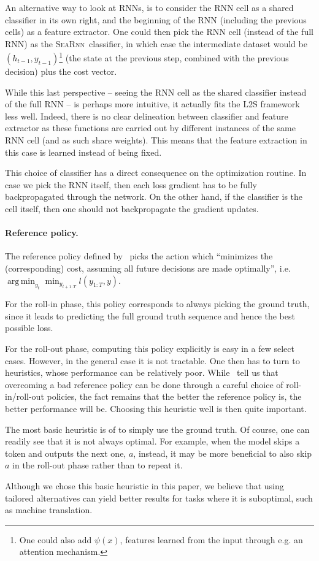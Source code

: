 \documentclass{article}
\newcommand{\SEARNN}{\textsc{SeaRnn}}
\DeclareMathOperator*{\argmin}{arg\,min}
\begin{document}
	An alternative way to look at RNNs, is to consider the RNN cell as a shared classifier in its own right, and the beginning of the RNN (including the previous cells) as a feature extractor.
	One could then pick the RNN cell (instead of the full RNN) as the \SEARNN\ classifier, in which case the intermediate dataset would be $(h_{t-1}, y_{t-1})$\footnote{One could also add $\psi(x)$, features learned from the input through e.g. an attention mechanism.} (the state at the previous step, combined with the previous decision) plus the cost vector.
	
	While this last perspective -- seeing the RNN cell as the shared classifier instead of the full RNN -- is perhaps more intuitive, it actually fits the L2S framework less well.
	Indeed, there is no clear delineation between classifier and feature extractor as these functions are carried out by different instances of the same RNN cell (and as such share weights).
	This means that the feature extraction in this case is learned instead of being fixed.
	
	This choice of classifier has a direct consequence on the optimization routine.
	In case we pick the RNN itself, then each loss gradient has to be fully backpropagated through the network.
	On the other hand, if the classifier is the cell itself, then one should not backpropagate the gradient updates.	

	\paragraph{Reference policy.}
	The reference policy defined by~\citet{Daume2009b} picks the action which ``minimizes the (corresponding) cost, assuming all future decisions are made optimally'', i.e. $\argmin_{y_t} \min_{y_{t+1:T}} l(y_{1:T}, y)$.

	For the roll-in phase, this policy corresponds to always picking the ground truth, since it leads to predicting the full ground truth sequence and hence the best possible loss.

	For the roll-out phase, computing this policy explicitly is easy in a few select cases.
	However, in the general case it is not tractable.
	One then has to turn to heuristics, whose performance can be relatively poor.
	While~\citet{Chang2015} tell us that overcoming a bad reference policy can be done through a careful choice of roll-in/roll-out policies, the fact remains that the better the reference policy is, the better performance will be.
	Choosing this heuristic well is then quite important.

	The most basic heuristic is of to simply use the ground truth.
	Of course, one can readily see that it is not always optimal.
	For example, when the model skips a token and outputs the next one, $a$, instead, it may be more beneficial to also skip $a$ in the roll-out phase rather than to repeat it.

	Although we chose this basic heuristic in this paper, we believe that using tailored alternatives can yield better results for tasks where it is suboptimal, such as machine translation.
\end{document}
